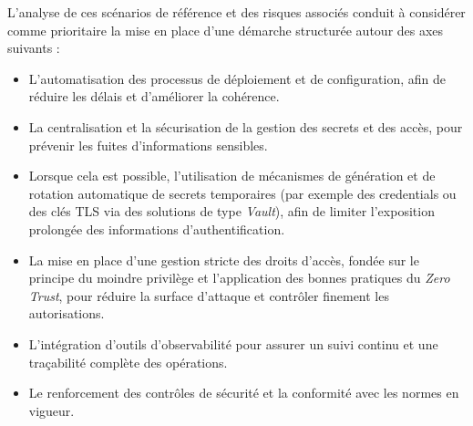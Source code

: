 L'analyse de ces scénarios de référence et des risques associés conduit à considérer comme prioritaire la mise en place d'une démarche structurée autour des axes suivants :
\begin{itemize}
	\item L'automatisation des processus de déploiement et de configuration, afin de réduire les délais et d'améliorer la cohérence.
	\item La centralisation et la sécurisation de la gestion des secrets et des accès, pour prévenir les fuites d'informations sensibles.
	\item Lorsque cela est possible, l'utilisation de mécanismes de génération et de rotation automatique de secrets temporaires (par exemple des credentials ou des clés TLS via des solutions de type \emph{Vault}), afin de limiter l'exposition prolongée des informations d'authentification.
	\item La mise en place d'une gestion stricte des droits d'accès, fondée sur le principe du moindre privilège et l'application des bonnes pratiques du \emph{Zero Trust}, pour réduire la surface d'attaque et contrôler finement les autorisations.
	\item L'intégration d'outils d'observabilité pour assurer un suivi continu et une traçabilité complète des opérations.
	\item Le renforcement des contrôles de sécurité et la conformité avec les normes en vigueur.
\end{itemize}

